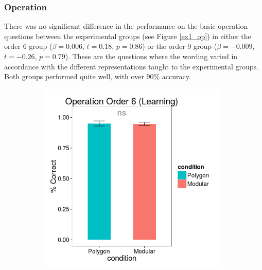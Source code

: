 \documentclass[11pt]{article}
\begin{document}
\subsubsection{Operation}
There was no significant difference in the performance on the basic operation questions between the experimental groups (see Figure \ref{ex1_op}) in either the order 6 group ($\beta = 0.006$, $t = 0.18$, $p = 0.86$) or the order 9 group ($\beta = -0.009$, $t = -0.26$, $p = 0.79$). These are the questions where the wording varied in accordance with the different representations taught to the experimental groups. Both groups performed quite well, with over 90\% accuracy. 
\begin{figure}[H]
\centering
\begin{subfigure}[c]{0.4\textwidth}
\centering
\includegraphics[width=\textwidth]{figures/1/op_6_r.png}
\end{subfigure}
~
\begin{subfigure}[c]{0.4\textwidth}
\centering

\end{subfigure}
\end{figure}
\end{document}
